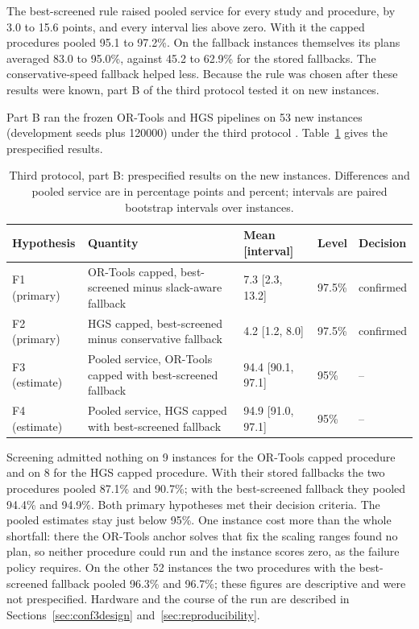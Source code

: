 The best-screened rule raised pooled service for every study and procedure, by 3.0 to 15.6 points, and every interval lies above zero. With it the capped procedures pooled 95.1 to 97.2\%. On the fallback instances themselves its plans averaged 83.0 to 95.0\%, against 45.2 to 62.9\% for the stored fallbacks. The conservative-speed fallback helped less. Because the rule was chosen after these results were known, part B of the third protocol tested it on new instances.

Part B ran the frozen OR-Tools and HGS pipelines on 53 new instances (development seeds plus 120000) under the third protocol \cite{ali2026freeze3}. Table~\ref{tab:partb} gives the prespecified results.

\begin{table}[htbp]
\centering
\footnotesize
\setlength{\tabcolsep}{4pt}
\caption{Third protocol, part B: prespecified results on the new instances. Differences and pooled service are in percentage points and percent; intervals are paired bootstrap intervals over instances.}
\label{tab:partb}
\begin{tabular}{@{}l>{\raggedright\arraybackslash}p{5.6cm}lll@{}}
\toprule
Hypothesis & Quantity & Mean [interval] & Level & Decision\\
\midrule
F1 (primary) & OR-Tools capped, best-screened minus slack-aware fallback & 7.3 [2.3, 13.2] & 97.5\% & confirmed\\
F2 (primary) & HGS capped, best-screened minus conservative fallback & 4.2 [1.2, 8.0] & 97.5\% & confirmed\\
F3 (estimate) & Pooled service, OR-Tools capped with best-screened fallback & 94.4 [90.1, 97.1] & 95\% & --\\
F4 (estimate) & Pooled service, HGS capped with best-screened fallback & 94.9 [91.0, 97.1] & 95\% & --\\
\bottomrule
\end{tabular}
\end{table}

Screening admitted nothing on 9 instances for the OR-Tools capped procedure and on 8 for the HGS capped procedure. With their stored fallbacks the two procedures pooled 87.1\% and 90.7\%; with the best-screened fallback they pooled 94.4\% and 94.9\%. Both primary hypotheses met their decision criteria. The pooled estimates stay just below 95\%. One instance cost more than the whole shortfall: there the OR-Tools anchor solves that fix the scaling ranges found no plan, so neither procedure could run and the instance scores zero, as the failure policy requires. On the other 52 instances the two procedures with the best-screened fallback pooled 96.3\% and 96.7\%; these figures are descriptive and were not prespecified. Hardware and the course of the run are described in Sections~\ref{sec:conf3design} and~\ref{sec:reproducibility}.
